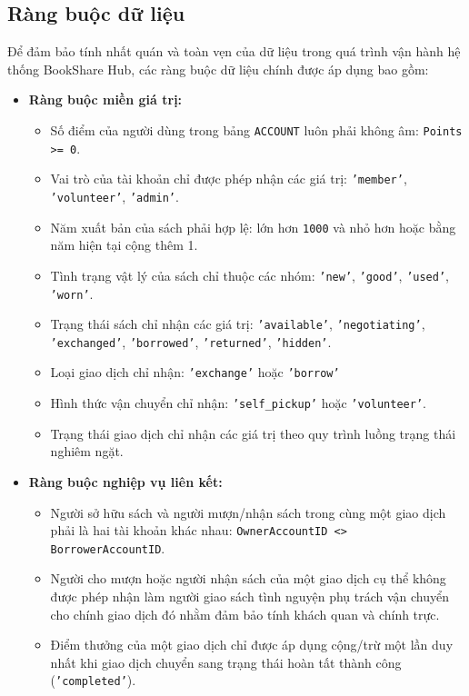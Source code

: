 \subsection{Ràng buộc dữ liệu}

Để đảm bảo tính nhất quán và toàn vẹn của dữ liệu trong quá trình vận hành hệ thống BookShare Hub, các ràng buộc dữ liệu chính được áp dụng bao gồm:
\begin{itemize}
    \item \textbf{Ràng buộc miền giá trị:}
    \begin{itemize}
        \item Số điểm của người dùng trong bảng \texttt{ACCOUNT} luôn phải không âm: \texttt{Points >= 0}.
        \item Vai trò của tài khoản chỉ được phép nhận các giá trị: \texttt{'member'}, \texttt{'volunteer'}, \texttt{'admin'}.
        \item Năm xuất bản của sách phải hợp lệ: lớn hơn \texttt{1000} và nhỏ hơn hoặc bằng năm hiện tại cộng thêm 1.
        \item Tình trạng vật lý của sách chỉ thuộc các nhóm: \texttt{'new'}, \texttt{'good'}, \texttt{'used'}, \texttt{'worn'}.
        \item Trạng thái sách chỉ nhận các giá trị: \texttt{'available'}, \texttt{'negotiating'}, \texttt{'exchanged'}, \texttt{'borrowed'}, \texttt{'returned'}, \texttt{'hidden'}.
        \item Loại giao dịch chỉ nhận: \texttt{'exchange'} hoặc \texttt{'borrow'}
        \item Hình thức vận chuyển chỉ nhận: \texttt{'self\_pickup'} hoặc \texttt{'volunteer'}.
        \item Trạng thái giao dịch chỉ nhận các giá trị theo quy trình luồng trạng thái nghiêm ngặt.
    \end{itemize}
    \item \textbf{Ràng buộc nghiệp vụ liên kết:}
    \begin{itemize}
        \item Người sở hữu sách và người mượn/nhận sách trong cùng một giao dịch phải là hai tài khoản khác nhau: \texttt{OwnerAccountID <> BorrowerAccountID}.
        \item Người cho mượn hoặc người nhận sách của một giao dịch cụ thể không được phép nhận làm người giao sách tình nguyện phụ trách vận chuyển cho chính giao dịch đó nhằm đảm bảo tính khách quan và chính trực.
        \item Điểm thưởng của một giao dịch chỉ được áp dụng cộng/trừ một lần duy nhất khi giao dịch chuyển sang trạng thái hoàn tất thành công (\texttt{'completed'}).
    \end{itemize}
\end{itemize}

